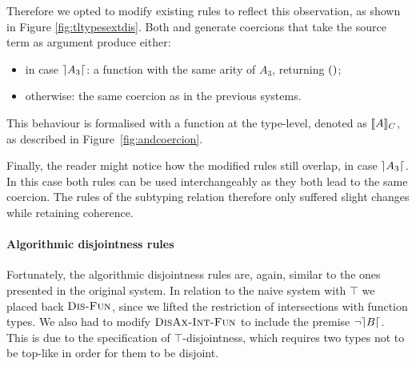 Therefore we opted to modify existing rules to reflect this observation, as shown in Figure \ref{fig:tltypesextdis}.
Both  and  generate coercions that take the source term 
as argument produce either:
\begin{itemize}
\item in case $\rceil A_3 \lceil$: a function with the same arity of $A_3$, returning $()$;  
\item otherwise: the same coercion as in the previous systems.
\end{itemize}
This behaviour is formalised with a function at the type-level, denoted as $\llbracket A \rrbracket_{C}$, as described in
Figure~\ref{fig:andcoercion}.

Finally, the reader might notice how the modified rules still overlap, in case $\rceil A_3 \lceil$. 
In this case both rules can be used interchangeably as they both lead to the same coercion.
The rules of the subtyping relation therefore only suffered slight changes while retaining coherence.

\paragraph{Algorithmic disjointness rules}

Fortunately, the algorithmic disjointness rules are, again, similar to the ones presented in the original system.
In relation to the naive system with $\top$ we placed back $\textsc{Dis-Fun}$, since we lifted the restriction
of intersections with function types.
We also had to modify $\textsc{DisAx-Int-Fun}$ to include the premise $\neg \rceil B \lceil$.
This is due to the specification of $\top$-disjointness, which requires two types not to be top-like in order for them to be disjoint.

